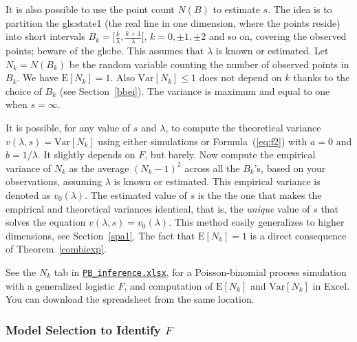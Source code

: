 \documentclass[10pt]{article}
\begin{document}

\noindent It is also possible to use the point count $N(B)$ to estimate $s$. The idea is to partition the \gls{gls:state1} 
(the real line in one dimension, where the points reside)  into short intervals $B_k=\Big[\frac{k}{\lambda},\frac{k+1}{\lambda}\Big[$, $k=0,\pm 1, \pm 2$ and so on, covering the observed points; beware of the \gls{gls:be}. This assumes that $\lambda$ is known or estimated. Let $N_k=N(B_k)$ be the random variable counting the number of observed points in $B_k$. We have $\mbox{E}[N_k]=1$. Also $\mbox{Var}[N_k]\leq 1$ does not depend on $k$ thanks to the
choice of $B_k$ (see Section~\ref{bbei}). The variance is maximum and equal to one when $s=\infty$. 

It is possible, for any value of $s$ and $\lambda$, to compute the theoretical variance $v(\lambda,s)=\mbox{Var}[N_k]$ using either simulations 
or Formula~(\ref{eq:f2}) with $a=0$ and $b=1/\lambda$. It slightly depends on $F$, but 
barely. Now compute the empirical variance of $N_k$ as the average $(N_k-1)^2$ across all the $B_k$'s, based on your observations, assuming $\lambda$ is known or estimated.  This empirical variance is denoted as $v_0(\lambda)$. The estimated value of $s$ is the the one that makes the empirical and theoretical variances identical, that is, the {\em unique} value of $s$ that solves the equation $v(\lambda,s)=v_0(\lambda)$. This method easily generalizes to higher dimensions, see Section~\ref{spa1}. The fact that $\mbox{E}[N_k]=1$
 is a direct consequence of Theorem~\ref{combiexp}.

See the $N_k$ tab in \href{https://github.com/VincentGranville/Point-Processes/tree/main/Spreadsheets}{\texttt{PB\_inference.xlsx}}, for a Poisson-binomial process simulation with a \textcolor{index}{generalized logistic} $F$, and computation of $\mbox{E}[N_k]$ and $\mbox{Var}[N_k]$ in Excel. You can download the spreadsheet from the same location.



\subsubsection{Model Selection to Identify $F$}\label{bore}
\end{document}
